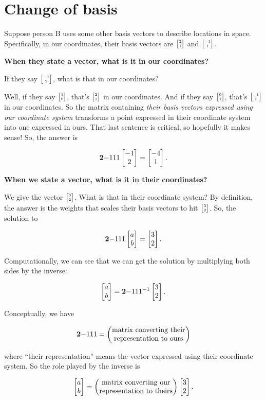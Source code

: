 \section{Change of basis}

Suppose person B uses some other basis vectors to describe locations in
space. Specifically, in our coordinates, their basis vectors are
$\tiny{\begin{bmatrix}2\\1\end{bmatrix}}$ and $\tiny{\begin{bmatrix}-1\\1\end{bmatrix}}$.


\textbf{When they state a vector, what is it in our coordinates?}

If they say $\tiny{\begin{bmatrix}-1\\2\end{bmatrix}}$, what is that in our coordinates?

Well, if they say $\tiny{\begin{bmatrix}1\\0\end{bmatrix}}$, that's $\tiny{\begin{bmatrix}2\\1\end{bmatrix}}$ in our coordinates. And
if they say $\tiny{\begin{bmatrix}0\\1\end{bmatrix}}$, that's $\tiny{\begin{bmatrix}-1\\1\end{bmatrix}}$ in our coordinates. So the
matrix containing \textit{their basis vectors expressed using our coordinate system}
transforms a point expressed in their coordinate system into one expressed in
ours. That last sentence is critical, so hopefully it makes sense! So, the answer is

$$
\mathbf{2}{-1}
    {1}{ 1} \begin{bmatrix}-1\\2\end{bmatrix} = \begin{bmatrix}-4\\1\end{bmatrix}.
$$


\textbf{When we state a vector, what is it in their coordinates?}

We give the vector $\tiny{\begin{bmatrix}3\\2\end{bmatrix}}$. What is that in their coordinate system? By
definition, the answer is the weights that scales their basis vectors to hit
$\tiny{\begin{bmatrix}3\\2\end{bmatrix}}$. So, the solution to

$$
\mathbf{2}{-1}
    {1}{1} \begin{bmatrix}a\\b\end{bmatrix} = \begin{bmatrix}3\\2\end{bmatrix}.
$$


Computationally, we can see that we can get the solution by multiplying both
sides by the inverse:

$$
\begin{bmatrix}a\\b\end{bmatrix} = \mathbf{2}{-1}
                  {1}{1}^{-1} \begin{bmatrix}3\\2\end{bmatrix}.
$$

Conceptually, we have

$$
\mathbf{2}{-1}
    {1}{1} =
\begin{pmatrix}\text{matrix converting their}\\\text{representation to ours} \\ \end{pmatrix}
$$

where ``their representation'' means the vector expressed using their coordinate
system. So the role played by the inverse is

$$
\begin{bmatrix}a\\b\end{bmatrix} =
\begin{pmatrix}\text{matrix converting our}\\\text{representation to theirs} \\ \end{pmatrix}
\begin{bmatrix}3\\2\end{bmatrix}.
$$

